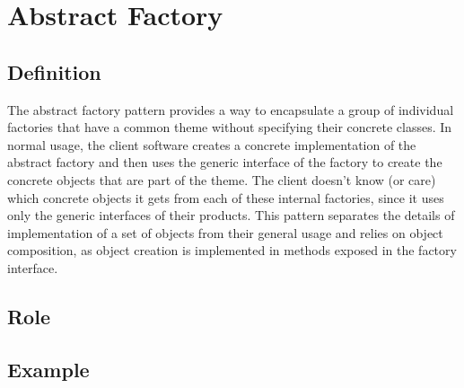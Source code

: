 \section{Abstract Factory}

\subsection{Definition}

The abstract factory pattern provides a way to encapsulate a group of individual factories that have a common theme without specifying their concrete classes. In normal usage, the client software creates a concrete implementation of the abstract factory and then uses the generic interface of the factory to create the concrete objects that are part of the theme. The client doesn't know (or care) which concrete objects it gets from each of these internal factories, since it uses only the generic interfaces of their products. This pattern separates the details of implementation of a set of objects from their general usage and relies on object composition, as object creation is implemented in methods exposed in the factory interface.

\subsection{Role}


\subsection{Example}